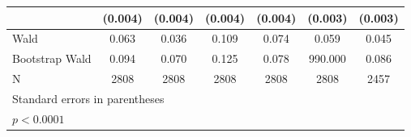 \begin{table}[htbp]
\begin{tabular}{l*{6}{c}}
            &     (0.004)       &     (0.004)       &     (0.004)       &     (0.004)       &     (0.003)       &     (0.003)       \\
\hline
Wald        &       0.063       &       0.036       &       0.109       &       0.074       &       0.059       &       0.045       \\
Bootstrap Wald&       0.094       &       0.070       &       0.125       &       0.078       &     990.000       &       0.086       \\
N           &        2808       &        2808       &        2808       &        2808       &        2808       &        2457       \\
\hline\hline
\multicolumn{7}{l}{\footnotesize Standard errors in parentheses}\\
\multicolumn{7}{l}{\footnotesize \sym{*} \(p<0.0001\)}\\
\end{tabular}
\end{table}
